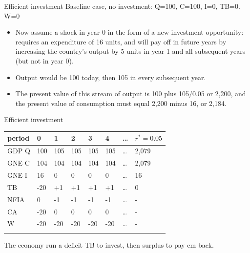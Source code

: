 \documentclass[
  ignorenonframetext,
]{beamer}
\begin{document}
\begin{frame}{Efficient investment}
\label{efficient-investment-2}
Baseline case, no investment: Q=100, C=100, I=0, TB=0. W=0

\begin{itemize}
\item
  Now assume a shock in year 0 in the form of a new investment
  opportunity: requires an expenditure of 16 units, and will pay off in
  future years by increasing the country's output by 5 units in year 1
  and all subsequent years (but not in year 0).
\item
  Output would be 100 today, then 105 in every subsequent year.
\item
  The present value of this stream of output is 100 plus 105/0.05 or
  2,200, and the present value of consumption must equal 2,200 minus 16,
  or 2,184.
\end{itemize}
\end{frame}

\begin{frame}{Efficient investment}
\label{efficient-investment-3}
\begin{longtable}[]{@{}llllllll@{}}
\toprule\noalign{}
period & 0 & 1 & 2 & 3 & 4 & \ldots{} & \(r^*=0.05\) \\
\midrule\noalign{}
\endhead
GDP Q & 100 & 105 & 105 & 105 & 105 & \ldots{} & 2,079 \\
GNE C & 104 & 104 & 104 & 104 & 104 & \ldots{} & 2,079 \\
GNE I & 16 & 0 & 0 & 0 & 0 & \ldots{} & 16 \\
TB & -20 & +1 & +1 & +1 & +1 & \ldots{} & 0 \\
NFIA & 0 & -1 & -1 & -1 & -1 & \ldots{} & - \\
CA & -20 & 0 & 0 & 0 & 0 & \ldots{} & - \\
W & -20 & -20 & -20 & -20 & -20 & \ldots{} & - \\
\bottomrule\noalign{}
\end{longtable}

The economy run a deficit TB to invest, then surplus to pay em back.
\end{frame}
\end{document}
